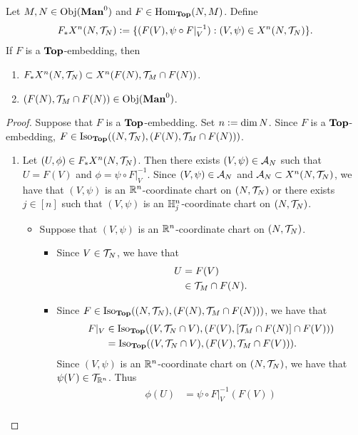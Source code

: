 \documentclass{book}
\begin{document}
\begin{ex} 
	Let $M, N \in \operatorname{Obj}(\operatorname*{\text{\textbf{Man}}^0})$ and $F \in \operatorname{Hom}_{\operatorname*{\text{\textbf{Top}}}}(N, M)$. Define 
	$$F_*X^n(N, \mathcal{T}_N) \vcentcolon= \{(F(V), \psi \circ F|_V^{-1}): (V, \psi) \in X^n(N, \mathcal{T}_N)\}.$$ 
	If $F$ is a $\operatorname*{\text{\textbf{Top}}}$-embedding, then 
	\begin{enumerate}
		\item $F_*X^n(N, \mathcal{T}_N) \subset X^n(F(N), \mathcal{T}_M \cap F(N))$.
		\item $(F(N), \mathcal{T}_M \cap F(N)) \in \operatorname{Obj}(\operatorname*{\text{\textbf{Man}}^0})$.
	\end{enumerate}
\end{ex}

\begin{proof}
	Suppose that $F$ is a $\operatorname*{\text{\textbf{Top}}}$-embedding. Set $n \vcentcolon= \dim N$. Since $F$ is a $\operatorname*{\text{\textbf{Top}}}$-embedding, $F \in \operatorname{Iso}_{\operatorname*{\text{\textbf{Top}}}}((N, \mathcal{T}_N), (F(N), \mathcal{T}_M \cap F(N)))$.
	\begin{enumerate}
		\item Let $(U, \phi) \in F_*X^n(N, \mathcal{T}_N)$. Then there exists $(V, \psi) \in \mathcal{A}_N$ such that $U = F(V)$ and $\phi = \psi \circ F|_V^{-1}$. Since $(V, \psi) \in \mathcal{A}_N$ and $\mathcal{A}_N \subset X^n(N, \mathcal{T}_N)$, we have that $(V, \psi)$ is an $\mathbb{R}^n$-coordinate chart on $(N, \mathcal{T}_N)$ or there exists $j \in [n]$ such that $(V, \psi)$ is an $\mathbb{H}^n_j$-coordinate chart on $(N, \mathcal{T}_N)$. 
		\begin{itemize}
			\item Suppose that $(V, \psi)$ is an $\mathbb{R}^n$-coordinate chart on $(N, \mathcal{T}_N)$. 
			\begin{itemize}
				\item Since $V \in \mathcal{T}_N$, we have that 
				\begin{align*}
					U
					& = F(V) \\
					& \in \mathcal{T}_M \cap F(N).
				\end{align*}
				\item Since $F \in \operatorname{Iso}_{\operatorname*{\text{\textbf{Top}}}}((N, \mathcal{T}_N), (F(N), \mathcal{T}_M \cap F(N)))$, we have that 
				\begin{align*}
					F|_V 
					& \in \operatorname{Iso}_{\operatorname*{\text{\textbf{Top}}}}((V, \mathcal{T}_N \cap V), (F(V), [\mathcal{T}_M \cap F(N)] \cap F(V))) \\
					& = \operatorname{Iso}_{\operatorname*{\text{\textbf{Top}}}}((V, \mathcal{T}_N \cap V), (F(V), \mathcal{T}_M \cap F(V))).
				\end{align*}
				Since $(V, \psi)$ is an $\mathbb{R}^n$-coordinate chart on $(N, \mathcal{T}_N)$, we have that $\psi(V) \in \mathcal{T}_{\mathbb{R}^n}$. Thus 
				\begin{align*}
					\phi(U)
					& = \psi \circ F|_V^{-1}( F(V)) \\

\end{align*}
\end{itemize}
\end{itemize}
\end{enumerate}
\end{proof}
\end{document}
